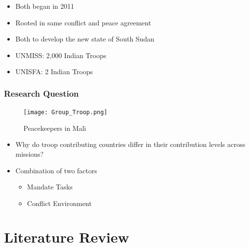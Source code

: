 \documentclass{beamer}
\begin{document}
\begin{frame}
\begin{centering}
\begin{itemize}
  \centering
\pause
\item \footnotesize Both began in 2011
\pause
\item \footnotesize Rooted in same conflict and peace agreement
\pause
\item \footnotesize Both to develop the new state of South Sudan  
\pause
\item \footnotesize UNMISS: 2,000 Indian Troops
\item \footnotesize UNISFA: 2 Indian Troops
\end{itemize}
\end{centering}
\end{frame}



\begin{frame}
\frametitle{Research Question}

\begin{figure}[t]
\centering
\texttt{[image: Group\_Troop.png]}
\caption{\scriptsize Peacekeepers in Mali}
\label{Troops}
\end{figure}

\vspace{0.5cm}

\begin{itemize}
  \item \footnotesize Why do troop contributing countries differ in their contribution levels across missions? 
  \pause
  \item \footnotesize Combination of two factors
  \begin{itemize}
    \item \footnotesize Mandate Tasks
    \item \footnotesize Conflict Environment
  \end{itemize}
\end{itemize}
\end{frame}

\section{Literature Review}

\end{document}
